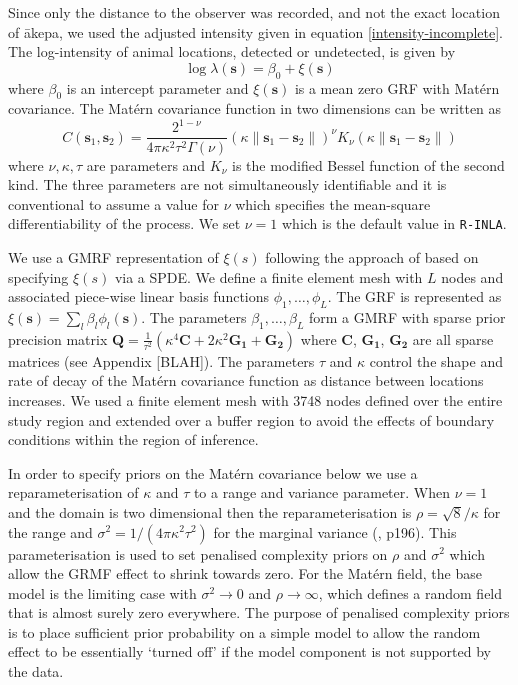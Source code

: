 \documentclass{stylefile16/statsoc}
\newcommand{\bs}{\mathbf{s}}
\newcommand{\bm}{\boldsymbol}  %
\newcommand{\akepa}{\textquotesingle\={a}kepa}  %
\begin{document}
Since only the distance to the observer was recorded, and not the exact location of \akepa{}, we used the adjusted intensity given in equation \eqref{intensity-incomplete}.  The log-intensity of animal locations, detected or undetected, is given by
\begin{equation*}
\log \lambda(\bs) = \beta_0 + \xi(\bs)
\end{equation*}
where $\beta_0$ is an intercept parameter and $\xi(\bs)$ is a mean zero GRF with Mat\'ern covariance.  The Mat\'ern covariance function in two dimensions can be written as 
\begin{equation}
C(\bs_1,\bs_2) = \frac{2^{1-\nu}}{4\pi\kappa^2\tau^2\Gamma(\nu)}(\kappa \|\bs_1-\bs_2\|)^{\nu}K_\nu(\kappa \|\bs_1-\bs_2\|)
\end{equation}
where \(\nu, \kappa, \tau\) are parameters and \(K_{\nu}\) is the modified Bessel function of the second kind.  The three parameters are not simultaneously identifiable \citep{zhang_inconsistent_2004} and it is conventional to assume a value for $\nu$ which specifies the mean-square differentiability of the process.  We set $\nu = 1$ which is the default value in \texttt{R-INLA}.

We use a GMRF representation of $\xi(s)$ following the approach of \cite{lindgren_explicit_2011} based on specifying $\xi(s)$ via a SPDE.  We define a finite element mesh with $L$ nodes and associated piece-wise linear basis functions $\phi_1, \ldots, \phi_L$. The GRF is represented as $\xi(\bs) = \sum_l \beta_l \phi_l(\bs)$.  The parameters $\beta_1, \ldots, \beta_L$ form a GMRF with sparse prior precision matrix $\bm{Q} = \frac{1}{\tau^2}\left(\kappa^4\bm{C} + 2\kappa^2\bm{G_1} + \bm{G_2}\right)$ where $\bm{C}$, $\bm{G_1}$, $\bm{G_2}$ are all sparse matrices (see Appendix [BLAH]). The parameters $\tau$ and $\kappa$ control the shape and rate of decay of the Mat\'ern covariance function as distance between locations increases. We used a finite element mesh with 3748 nodes defined over the entire study region and extended over a buffer region to avoid the effects of boundary conditions within the region of inference.

In order to specify priors on the Mat\'ern covariance below we use a reparameterisation of $\kappa$ and $\tau$ to a range and variance parameter.  When $\nu = 1$ and the domain is two dimensional then the reparameterisation is $\rho = \sqrt{8} / \kappa$ for the range and $\sigma^2 = 1 / (4\pi\kappa^2\tau^2)$ for the marginal variance (\cite{blangiardo_spatial_2013}, p196).  This parameterisation is used to set penalised complexity priors \citep{simpson_penalising_2017} on $\rho$ and $\sigma^2$ which allow the GRMF effect to shrink towards zero.  For the Mat\'ern field, the base model is the limiting case with $\sigma^2 \rightarrow 0$ and $\rho \rightarrow \infty$, which defines a random field that is almost surely zero everywhere.  The purpose of penalised complexity priors is to place sufficient prior probability on a simple model to allow the random effect to be essentially `turned off' if the model component is not supported by the data.  
\end{document}
